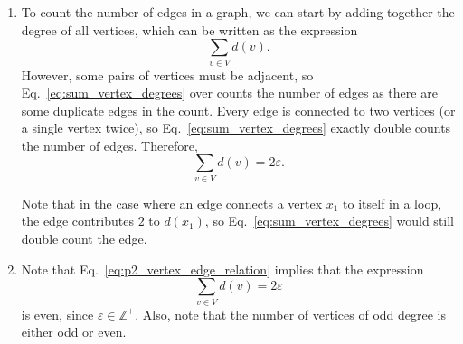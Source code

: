 \documentclass[12pt]{extarticle}
\begin{document}
\begin{sol} \hfill
	\begin{enumerate}[label=(\alph*)]
		\item To count the number of edges in a graph, we can start by adding together the degree of all vertices, which can be written as the expression
		      \begin{equation}
			      \sum_{v\in V} d(v). \label{eq:sum_vertex_degrees}
		      \end{equation}
		      However, some pairs of vertices must be adjacent, so Eq.~\eqref{eq:sum_vertex_degrees} over counts the number of edges as there are some duplicate edges in the count.
		      Every edge is connected to two vertices (or a single vertex twice), so Eq.~\eqref{eq:sum_vertex_degrees} exactly double counts the number of edges.
		      Therefore,
		      \begin{equation}
			      \sum_{v\in V}d(v) = 2 \varepsilon. \label{eq:p2_vertex_edge_relation}
		      \end{equation}

		      Note that in the case where an edge connects a vertex $x_1$ to itself in a loop, the edge contributes $2$ to $d(x_1)$, so Eq.~\eqref{eq:sum_vertex_degrees} would still double count the edge.
		\item Note that Eq.~\eqref{eq:p2_vertex_edge_relation} implies that the expression
		      \begin{equation}
			      \sum_{v\in V} d(v) = 2 \varepsilon
		      \end{equation}
		      is even, since $\varepsilon \in \mathbb{Z}^+$.
		      Also, note that the number of vertices of odd degree is either odd or even.


\end{enumerate}
\end{sol}
\end{document}
